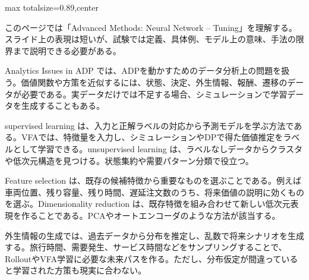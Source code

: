 \begin{minipage}[t]{0.58\textwidth}
\begin{adjustbox}{max totalsize={\textwidth}{0.89\textheight},center}
\begin{minipage}{\textwidth}\scriptsize
{}このページでは「Advanced Methods: Neural Network – Tuning」を理解する。スライド上の表現は短いが、試験では定義、具体例、モデル上の意味、手法の限界まで説明できる必要がある。\par
Analytics Issues in ADP では、ADPを動かすためのデータ分析上の問題を扱う。価値関数や方策を近似するには、状態、決定、外生情報、報酬、遷移のデータが必要である。実データだけでは不足する場合、シミュレーションで学習データを生成することもある。\par
supervised learning は、入力と正解ラベルの対応から予測モデルを学ぶ方法である。VFAでは、特徴量を入力し、シミュレーションやDPで得た価値推定をラベルとして学習できる。unsupervised learning は、ラベルなしデータからクラスタや低次元構造を見つける。状態集約や需要パターン分類で役立つ。\par
Feature selection は、既存の候補特徴から重要なものを選ぶことである。例えば車両位置、残り容量、残り時間、遅延注文数のうち、将来価値の説明に効くものを選ぶ。Dimensionality reduction は、既存特徴を組み合わせて新しい低次元表現を作ることである。PCAやオートエンコーダのような方法が該当する。\par
外生情報の生成では、過去データから分布を推定し、乱数で将来シナリオを生成する。旅行時間、需要発生、サービス時間などをサンプリングすることで、RolloutやVFA学習に必要な未来パスを作る。ただし、分布仮定が間違っていると学習された方策も現実に合わない。\par

\end{minipage}
\end{adjustbox}
\end{minipage}
